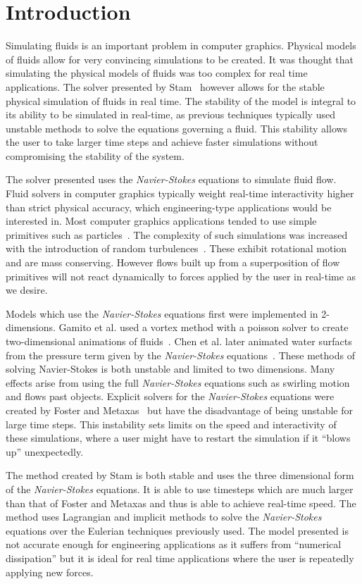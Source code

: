 \section{Introduction}
Simulating fluids is an important problem in computer graphics. 
Physical models of fluids allow for very convincing simulations to be created.
It was thought that simulating the physical models of fluids was too complex for real time applications.
The solver presented by Stam~\cite{DBLP:conf/siggraph/Stam99a} however allows for the stable physical simulation of fluids in real time.
The stability of the model is integral to its ability to be simulated in real-time, as previous techniques typically used unstable methods to solve the equations governing a fluid.
This stability allows the user to take larger time steps and achieve faster simulations without compromising the stability of the system.

The solver presented uses the \emph{Navier-Stokes} equations to simulate fluid flow.
Fluid solvers in computer graphics typically weight real-time interactivity higher than strict physical accuracy, which engineering-type applications would be interested in.
Most computer graphics applications tended to use simple primitives such as particles~\cite{Reeves83particlesystems}.
The complexity of such simulations was increased with the introduction of random turbulences~\cite{Chen97real-timefluid}.
These exhibit rotational motion and are mass conserving. 
However flows built up from a superposition of flow primitives will not react dynamically to forces applied by the user in real-time as we desire.

Models which use the \emph{Navier-Stokes} equations first were implemented in 2-dimensions.
Gamito et al. used a vortex method with a poisson solver to create two-dimensional animations of fluids~\cite{Gamito95two-dimensionalsimulation}.
Chen et al. later animated water surfacts from the pressure term given by the \emph{Navier-Stokes} equations~\cite{Chen97real-timefluid}.
These methods of solving Navier-Stokes is both unstable and limited to two dimensions. 
Many effects arise from using the full \emph{Navier-Stokes} equations such as swirling motion and flows past objects.
Explicit solvers for the \emph{Navier-Stokes} equations were created by Foster and Metaxas~\cite{Foster97modelingthe} but have the disadvantage of being unstable for large time steps.
This instability sets limits on the speed and interactivity of these simulations, where a user might have to restart the simulation if it ``blows up'' unexpectedly.

The method created by Stam is both stable and uses the three dimensional form of the \emph{Navier-Stokes} equations.
It is able to use timesteps which are much larger than that of Foster and Metaxas and thus is able to achieve real-time speed.
The method uses Lagrangian and implicit methods to solve the \emph{Navier-Stokes} equations over the Eulerian techniques previously used.
The model presented is not accurate enough for engineering applications as it suffers from ``numerical dissipation'' but it is ideal for real time applications where the user is repeatedly applying new forces.
